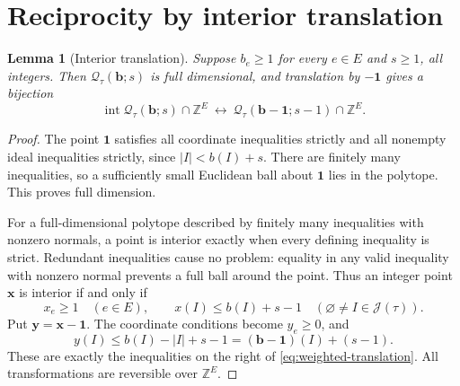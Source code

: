 \documentclass[11pt,letterpaper]{article}
\newtheorem{lemma}[lemma]{Lemma}
\theoremstyle{definition}
\newcommand{\Z}{\mathbb Z}
\newcommand{\one}{\mathbf 1}
\newcommand{\bvec}{\mathbf b}
\newcommand{\xvec}{\mathbf x}
\newcommand{\yvec}{\mathbf y}
\newcommand{\JJ}{\mathcal J}
\newcommand{\QQ}{\mathcal Q}
\DeclareMathOperator{\Int}{int}
\newcommand{\card}[1]{\lvert #1\rvert}
\begin{document}
\section{Reciprocity by interior translation}\label{sec:reciprocity}

\begin{lemma}[Interior translation]\label{lem:translation}
Suppose $b_e\geq1$ for every $e\in E$ and $s\geq1$, all integers. Then
$\QQ_\tau(\bvec;s)$ is full dimensional, and translation by $-\one$ gives
a bijection
\begin{equation}\label{eq:weighted-translation}
 \Int\QQ_\tau(\bvec;s)\cap\Z^E
 \ \longleftrightarrow\
 \QQ_\tau(\bvec-\one;s-1)\cap\Z^E.
\end{equation}
\end{lemma}
\begin{proof}
The point $\one$ satisfies all coordinate inequalities strictly and all
nonempty ideal inequalities strictly, since
$\card I<b(I)+s$. There are finitely many inequalities, so a sufficiently
small Euclidean ball about $\one$ lies in the polytope. This proves full
dimension.

For a full-dimensional polytope described by finitely many inequalities with
nonzero normals, a point is interior exactly when every defining inequality
is strict. Redundant inequalities cause no problem: equality in any valid
inequality with nonzero normal prevents a full ball around the point. Thus an
integer point $\xvec$ is interior if and only if
\[
 x_e\geq1\quad(e\in E),\qquad
 x(I)\leq b(I)+s-1\quad(\varnothing\ne I\in\JJ(\tau)).
\]
Put $\yvec=\xvec-\one$. The coordinate conditions become $y_e\geq0$, and
\[
 y(I)\leq b(I)-\card I+s-1=(\bvec-\one)(I)+(s-1).
\]
These are exactly the inequalities on the right of
\eqref{eq:weighted-translation}. All transformations are reversible over
$\Z^E$.
\end{proof}
\end{document}
